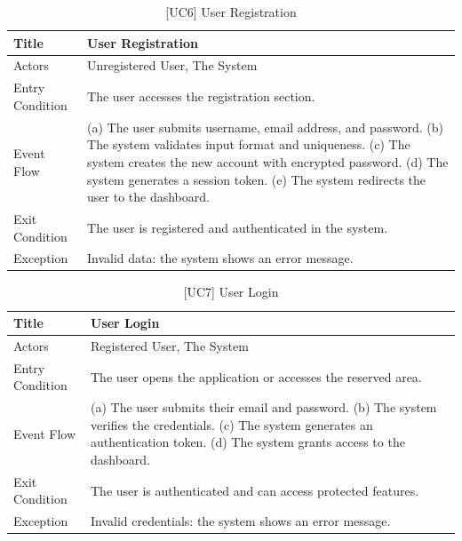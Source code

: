 \begin{table}[H]
    \centering
    \begin{tabular}{|p{4cm}|p{10cm}|}
        \hline
        Title & \textbf{User Registration} \\
        \hline
        Actors & Unregistered User, The System \\
        \hline
        Entry Condition & The user accesses the registration section. \\
        \hline
        Event Flow & 
        (a) The user submits username, email address, and password. \newline
        (b) The system validates input format and uniqueness. \newline
        (c) The system creates the new account with encrypted password. \newline
        (d) The system generates a session token. \newline
        (e) The system redirects the user to the dashboard. \\
        \hline
        Exit Condition & The user is registered and authenticated in the system. \\
        \hline
        Exception & 
        Invalid data: the system shows an error message. \\
        \hline
    \end{tabular}
    \caption{[UC6] User Registration}
    \label{tab:uc6}
\end{table}

\begin{table}[H]
    \centering
    \begin{tabular}{|p{4cm}|p{10cm}|}
        \hline
        Title & \textbf{User Login} \\
        \hline
        Actors & Registered User, The System \\
        \hline
        Entry Condition & The user opens the application or accesses the reserved area. \\
        \hline
        Event Flow & 
        (a) The user submits their email and password. \newline
        (b) The system verifies the credentials. \newline
        (c) The system generates an authentication token. \newline
        (d) The system grants access to the dashboard. \\
        \hline
        Exit Condition & The user is authenticated and can access protected features. \\
        \hline
        Exception & 
        Invalid credentials: the system shows an error message. \\
        \hline
    \end{tabular}
    \caption{[UC7] User Login}
    \label{tab:uc7}
\end{table}

